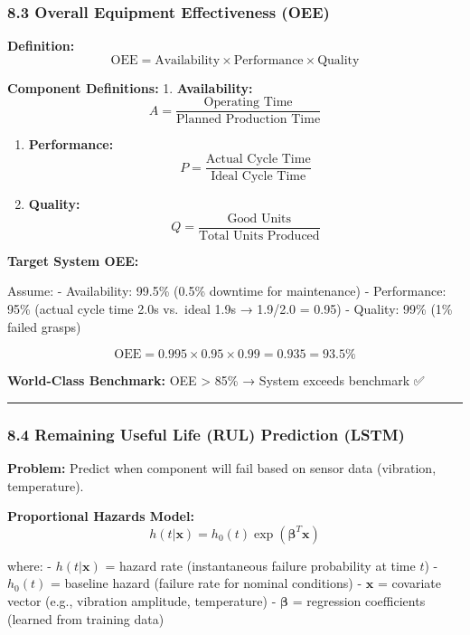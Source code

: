 \documentclass[
]{article}
\begin{document}
\hypertarget{overall-equipment-effectiveness-oee}{%
\subsubsection{8.3 Overall Equipment Effectiveness
(OEE)}\label{overall-equipment-effectiveness-oee}}

\textbf{Definition:} \[
\text{OEE} = \text{Availability} \times \text{Performance} \times \text{Quality}
\]

\textbf{Component Definitions:} 1. \textbf{Availability:} \[
   A = \frac{\text{Operating Time}}{\text{Planned Production Time}}
   \]

\begin{enumerate}
\def\labelenumi{\arabic{enumi}.}
\setcounter{enumi}{1}
\item
  \textbf{Performance:} \[
  P = \frac{\text{Actual Cycle Time}}{\text{Ideal Cycle Time}}
  \]
\item
  \textbf{Quality:} \[
  Q = \frac{\text{Good Units}}{\text{Total Units Produced}}
  \]
\end{enumerate}

\textbf{Target System OEE:}

Assume: - Availability: 99.5\% (0.5\% downtime for maintenance) -
Performance: 95\% (actual cycle time 2.0s vs.~ideal 1.9s → 1.9/2.0 =
0.95) - Quality: 99\% (1\% failed grasps)

\[
\text{OEE} = 0.995 \times 0.95 \times 0.99 = 0.935 = 93.5\%
\]

\textbf{World-Class Benchmark:} OEE \textgreater{} 85\% → System exceeds
benchmark ✅

\begin{center}\rule{0.5\linewidth}{0.5pt}\end{center}

\hypertarget{remaining-useful-life-rul-prediction-lstm}{%
\subsubsection{8.4 Remaining Useful Life (RUL) Prediction
(LSTM)}\label{remaining-useful-life-rul-prediction-lstm}}

\textbf{Problem:} Predict when component will fail based on sensor data
(vibration, temperature).

\textbf{Proportional Hazards Model:} \[
h(t | \mathbf{x}) = h_0(t) \exp(\boldsymbol{\beta}^T \mathbf{x})
\]

where: - \(h(t | \mathbf{x})\) = hazard rate (instantaneous failure
probability at time \(t\)) - \(h_0(t)\) = baseline hazard (failure rate
for nominal conditions) - \(\mathbf{x}\) = covariate vector (e.g.,
vibration amplitude, temperature) - \(\boldsymbol{\beta}\) = regression
coefficients (learned from training data)
\end{document}
